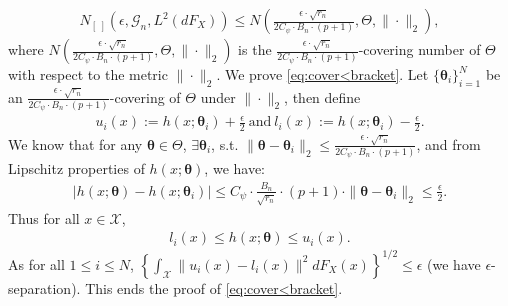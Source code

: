 \documentclass[11pt]{article}
\numberwithin{equation}{section}
\begin{document}
\begin{align}\label{eq:cover<bracket}
	N_{[\ ]}\left(\epsilon,\mathcal{G}_{n},L^2(dF_X) \right)\leq N\left(\frac{\epsilon\cdot \sqrt{r_n}}{2C_{\psi}\cdot B_n\cdot (p+1)},\Theta,\|\cdot\|_2\right),
\end{align}
where $N\left(\frac{\epsilon\cdot \sqrt{r_n}}{2C_{\psi}\cdot B_n\cdot (p+1)},\Theta,\|\cdot\|_2\right)$ is the $\frac{\epsilon\cdot \sqrt{r_n}}{2C_{\psi}\cdot B_n\cdot (p+1)}$-covering number of $\Theta$ with respect to the metric $\|\cdot\|_2$.   We prove  \eqref{eq:cover<bracket}. Let $\{\boldsymbol{\theta}_i\}_{i=1}^N$ be an $\frac{\epsilon\cdot \sqrt{r_n}}{2C_{\psi}\cdot B_n\cdot (p+1)}$-covering of $\Theta$ under $\|\cdot\|_2$, then define
\begin{align*}
	u_{i}(x):=h(x;\boldsymbol{\theta}_i)+\frac{\epsilon}{2}\  \text{and} \	l_{i}(x):=h(x;\boldsymbol{\theta}_i)-\frac{\epsilon}{2}.
\end{align*}
We know that for any $\boldsymbol{\theta}\in\Theta$, $\exists \boldsymbol{\theta}_i$, s.t. $\|\boldsymbol{\theta}-\boldsymbol{\theta}_i\|_2\leq\frac{\epsilon\cdot \sqrt{r_n}}{2C_{\psi}\cdot B_n\cdot (p+1)}$, and from Lipschitz properties of $h(x;\boldsymbol{\theta})$, we have:
\begin{align*}
	|h(x;\boldsymbol{\theta})-h(x;\boldsymbol{\theta}_i)|\leq C_{\psi}\cdot \frac{B_n}{\sqrt{r_n}}\cdot (p+1)\cdot \|\boldsymbol{\theta}-\boldsymbol{\theta}_i\|_2\leq \frac{\epsilon}{2}.
\end{align*}
Thus for all $x\in \mathcal{X}$,
\begin{align*}
	l_{i}(x)	\leq h(x;\boldsymbol{\theta})\leq u_{i}(x).
\end{align*}
As  for all $1\leq i\leq N$,  $\left\{\int_{\mathcal{X}}\|u_{i}(x)-l_{i}(x)\|^2dF_X(x)\right\}^{1/2}\leq \epsilon$ (we have $\epsilon$-separation). This ends the proof of \eqref{eq:cover<bracket}.
\end{document}
